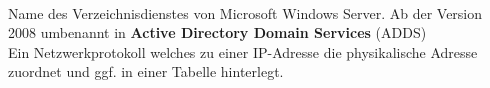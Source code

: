 
\begin{acronym}
	\\
	Name des Verzeichnisdienstes von Microsoft Windows Server. Ab der Version 2008 umbenannt in \textbf{Active Directory Domain Services} (ADDS)
	\\
	Ein Netzwerkprotokoll welches zu einer IP-Adresse die physikalische Adresse zuordnet und ggf. in einer Tabelle hinterlegt.
\end{acronym}